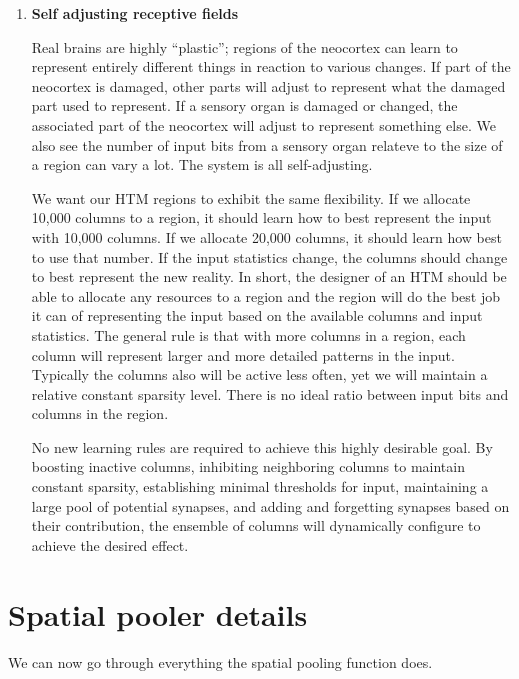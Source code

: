 \documentclass{report}
\begin{document}
\begin{enumerate}
\item {\bf Self adjusting receptive fields}

Real brains are highly ``plastic''; regions of the neocortex can learn
to represent entirely different things in reaction to various
changes. If part of the neocortex is damaged, other parts will adjust
to represent what the damaged part used to represent. If a sensory
organ is damaged or changed, the associated part of the neocortex will
adjust to represent something else. We also see the number of input
bits from a sensory organ relateve to the size of a region can vary
a lot.  The system is all self-adjusting.

We want our HTM regions to exhibit the same flexibility. If we
allocate 10,000 columns to a region, it should learn how to best
represent the input with 10,000 columns. If we allocate 20,000
columns, it should learn how best to use that number. If the input
statistics change, the columns should change to best represent the new
reality. In short, the designer of an HTM should be able to allocate
any resources to a region and the region will do the best job it can
of representing the input based on the available columns and input
statistics. The general rule is that with more columns in a region,
each column will represent larger and more detailed patterns in the
input. Typically the columns also will be active less often, yet we
will maintain a relative constant sparsity level.  There is no ideal
ratio between input bits and columns in the region.

No new learning rules are required to achieve this highly desirable
goal. By boosting inactive columns, inhibiting neighboring columns to
maintain constant sparsity, establishing minimal thresholds for input,
maintaining a large pool of potential synapses, and adding and
forgetting synapses based on their contribution, the ensemble of
columns will dynamically configure to achieve the desired effect.
\end{enumerate}

\section*{Spatial pooler details}

We can now go through everything the spatial pooling function does.
\end{document}
